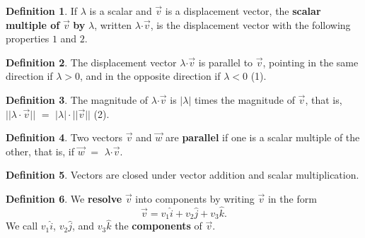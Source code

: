 \documentclass[12pt, a4paper]{article}
\theoremstyle{plain}
\theoremstyle{definition}
\newtheorem{definition}{Definition}[section]
\theoremstyle{remark}
\begin{document}
\begin{definition}
If $\lambda$ is a scalar and $\vec{v}$ is a displacement vector, the \textbf{scalar multiple of} $\vec{v}$ \textbf{by} $\lambda$, written $\lambda$$\cdot$$\vec{v}$, is the displacement vector with the following properties $1$ and $2$.
\end{definition}

\begin{definition}
The displacement vector $\lambda$$\cdot$$\vec{v}$ is parallel to $\vec{v}$, pointing in the same direction if $\lambda$$>$$0$, and in the opposite direction if $\lambda$$<$$0$ (1).
\end{definition}

\begin{definition}
The magnitude of $\lambda$$\cdot$$\vec{v}$ is $|\lambda|$ times the magnitude of $\vec{v}$, that is, $||\lambda \cdot \vec{v}||$ $=$ $|\lambda| \cdot ||\vec{v}||$ (2).
\end{definition}

\begin{definition}
Two vectors $\vec{v}$ and $\vec{w}$ are \textbf{parallel} if one is a scalar multiple of the other, that is, if $\vec{w}$ $=$ $\lambda$$\cdot$$\vec{v}$.
\end{definition}



\begin{definition}
Vectors are closed under vector addition and scalar multiplication.  
\end{definition}


\begin{definition}
We \textbf{resolve} $\vec{v}$ into components by writing $\vec{v}$ in the form
$$ \vec{v} = v_1 \hat{i} + v_2 \hat{j} + v_3 \hat{k}. $$
We call $v_1 \hat{i}$, $v_2 \hat{j}$, and $v_3 \hat{k}$ the \textbf{components} of $\vec{v}$.
\end{definition}
\end{document}
